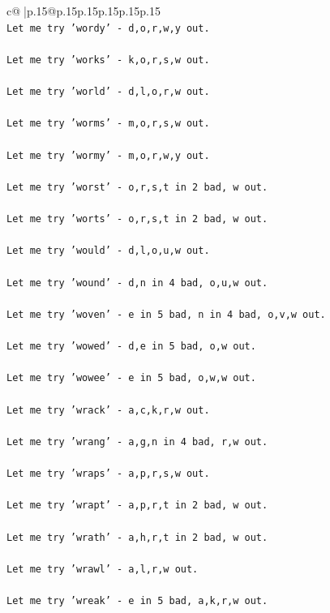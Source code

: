 \documentclass{article}
\begin{document}
{\begin{supertabular}{c@{$\;$}|p{.15\linewidth}@{}p{.15\linewidth}p{.15\linewidth}p{.15\linewidth}p{.15\linewidth}p{.15\linewidth}}
{{{\\ 
\texttt{Let me try 'wordy' {-} d,o,r,w,y out. } \\
\\ 
\texttt{Let me try 'works' {-} k,o,r,s,w out. } \\
\\ 
\texttt{Let me try 'world' {-} d,l,o,r,w out. } \\
\\ 
\texttt{Let me try 'worms' {-} m,o,r,s,w out. } \\
\\ 
\texttt{Let me try 'wormy' {-} m,o,r,w,y out. } \\
\\ 
\texttt{Let me try 'worst' {-} o,r,s,t in 2 bad, w out. } \\
\\ 
\texttt{Let me try 'worts' {-} o,r,s,t in 2 bad, w out. } \\
\\ 
\texttt{Let me try 'would' {-} d,l,o,u,w out. } \\
\\ 
\texttt{Let me try 'wound' {-} d,n in 4 bad, o,u,w out. } \\
\\ 
\texttt{Let me try 'woven' {-} e in 5 bad, n in 4 bad, o,v,w out. } \\
\\ 
\texttt{Let me try 'wowed' {-} d,e in 5 bad, o,w out. } \\
\\ 
\texttt{Let me try 'wowee' {-} e in 5 bad, o,w,w out. } \\
\\ 
\texttt{Let me try 'wrack' {-} a,c,k,r,w out. } \\
\\ 
\texttt{Let me try 'wrang' {-} a,g,n in 4 bad, r,w out. } \\
\\ 
\texttt{Let me try 'wraps' {-} a,p,r,s,w out. } \\
\\ 
\texttt{Let me try 'wrapt' {-} a,p,r,t in 2 bad, w out. } \\
\\ 
\texttt{Let me try 'wrath' {-} a,h,r,t in 2 bad, w out. } \\
\\ 
\texttt{Let me try 'wrawl' {-} a,l,r,w out. } \\
\\ 
\texttt{Let me try 'wreak' {-} e in 5 bad, a,k,r,w out. } \\
}}}
\end{supertabular}}
\end{document}
